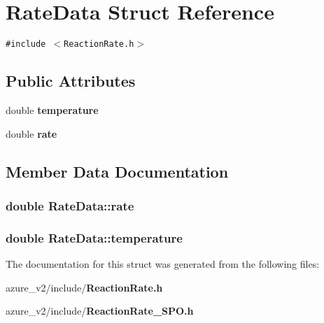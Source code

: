 \section{Rate\-Data Struct Reference}
\label{structRateData}
{\tt \#include $<$Reaction\-Rate.h$>$}

\subsection*{Public Attributes}
\begin{CompactItemize}
\item 
double \bf{temperature}
\item 
double \bf{rate}
\end{CompactItemize}


\subsection{Member Data Documentation}
\subsubsection{\setlength{\rightskip}{0pt plus 5cm}double \bf{Rate\-Data::rate}}\label{structRateData_6482bc9acf60f96985e989470a15006f}


\subsubsection{\setlength{\rightskip}{0pt plus 5cm}double \bf{Rate\-Data::temperature}}\label{structRateData_6544dcf8f3ed0c3ba0b62fde9c0a0695}




The documentation for this struct was generated from the following files:\begin{CompactItemize}
\item 
azure\_\-v2/include/\bf{Reaction\-Rate.h}\item 
azure\_\-v2/include/\bf{Reaction\-Rate\_\-SPO.h}\end{CompactItemize}
